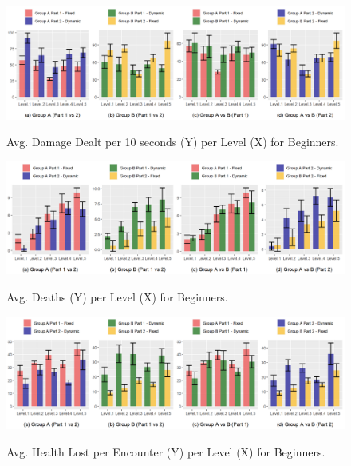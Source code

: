 \begin{figure}[!ht]
    \begin{center}
    \caption{Avg. Damage Dealt per 10 seconds (Y) per Level (X) for Beginners.}
        \includegraphics[width=\textwidth]{figures/damage_dealt_per_10s-beginner_players.png}
        \label{fig:result-metric-beginners-damage-dealt-per-10s}
    \end{center}
\end{figure}

\begin{figure}[!ht]
    \begin{center}
    \caption{Avg. Deaths (Y) per Level (X) for Beginners.}
        \includegraphics[width=\textwidth]{figures/deaths_per_level-beginner_players.png}
        \label{fig:result-metric-beginners-deaths-per-level}
    \end{center}
\end{figure}

\begin{figure}[!ht]
    \begin{center}
    \caption{Avg. Health Lost per Encounter (Y) per Level (X) for Beginners.}
        \includegraphics[width=\textwidth]{figures/health_lost_per_encounter-beginner_players.png}
        \label{fig:result-metric-beginners-health-lost-per-encounter}
    \end{center}
\end{figure}

